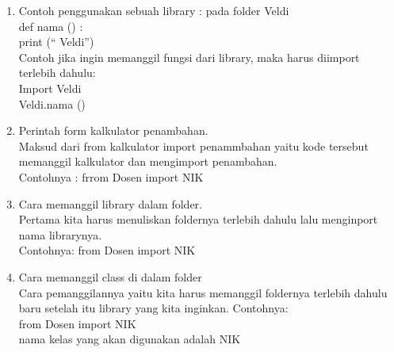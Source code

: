 \begin{enumerate}
	\item Contoh penggunakan sebuah library : pada folder Veldi\\
	def  nama () :\\
	print (“ Veldi”)\\
	Contoh jika ingin memanggil fungsi dari library, maka harus diimport terlebih dahulu:\\
	Import Veldi\\
	Veldi.nama ()\\
	
	\item Perintah form kalkulator penambahan.\\
	Maksud dari from kalkulator import penammbahan yaitu kode tersebut memanggil kalkulator dan mengimport penambahan.\\
	Contohnya : frrom Dosen import NIK\\
	
	\item Cara memanggil library dalam folder.\\
	Pertama kita harus menuliskan foldernya terlebih dahulu lalu menginport nama librarynya.\\
    Contohnya: from Dosen import NIK\\ 
	
	\item Cara memanggil class di dalam folder\\
	Cara pemanggilannya yaitu kita harus memanggil foldernya terlebih dahulu baru setelah itu library yang kita inginkan. Contohnya:\\
	from Dosen import NIK\\
	nama kelas yang akan digunakan adalah NIK\\
	


\end{enumerate}
